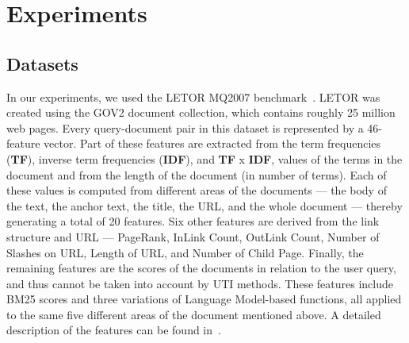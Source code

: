 \documentclass[preprint,review,10pt,3p]{elsarticle}
\begin{document}


\section{Experiments}
\label{experiments}


\subsection{Datasets}
\label{sec:datasets}

In our experiments, we used the LETOR MQ2007 benchmark~\cite{liu2007letor}. LETOR  was  created using  the GOV2 document collection, which contains roughly 25 million web pages.  Every query-document pair in this dataset is represented by a 46-feature vector. Part of these features are extracted from the term frequencies (\textbf{TF}), inverse term frequencies (\textbf{IDF}), and \textbf{TF} x \textbf{IDF}, values of the terms in the document and from the length of the document (in number of terms). Each of these values is computed from different areas of the documents --- the body of the text, the anchor text, the title, the URL, and the whole document --- thereby generating a total of 20 features. Six other features are derived from the link structure and URL --- PageRank, InLink Count, OutLink Count, Number of Slashes on URL, Length of URL, and Number of Child Page. Finally, the remaining features are the scores of the documents in relation to the user query, and thus cannot be taken into account by UTI methods. These features include BM25  scores and three variations of Language Model-based functions, all applied to the same five different areas of the document mentioned above.  A detailed description of the features can be found in~\cite{liu2007letor}. 
\end{document}
